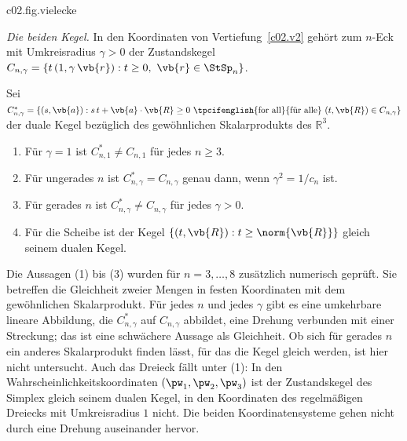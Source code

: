 \begin{vertiefung}
  \begin{tpcfigure}{c02.fig.vielecke}
    \caption{Dasselbe Punktepaar $x_1 = (1,0)$, $x_2 = (-\tfrac34, \tfrac14)$ in drei
      Zustandsräumen, jeweils mit den Niveaulinien eines optimalen Extremaleffekts. (a) Im
      Quadrat $\StSp_4$ liegt $x_2$ auf der Kante, auf der der Effekt den Wert $0$ hat; die
      Unterscheidung gelingt sicher. (b) Im Fünfeck liegt $x_2$ im Inneren, knapp neben
      der Kante mit $f = 0$. (c) In der Scheibe berührt die Linie $f = 0$ den Rand in einem
      einzigen Punkt, und $x_2$ liegt deutlich daneben. Die Optima stehen in
      \eqref{c02.eq.gleiches-paar}.}
  \end{tpcfigure}

  \emph{Die beiden Kegel.} In den Koordinaten von Vertiefung~\ref{c02.v2} gehört zum
  $n$-Eck mit Umkreisradius $\gamma > 0$ der Zustandskegel
  $C_{n,\gamma} = \{ t\,(1, \gamma\,\vb{r}) : t \geq 0,\ \vb{r} \in \StSp_n \}$.

  \begin{proposition}\label{c02.prop.selbstdual}
    Sei $C_{n,\gamma}^{*} = \{ (s, \vb{a}) : s\,t + \vb{a}\cdot\vb{R} \geq 0
    \ \text{\tpcifenglish{for all}{für alle}}\ (t, \vb{R}) \in C_{n,\gamma} \}$ der duale
    Kegel bezüglich des gewöhnlichen Skalarprodukts des $\mathbb{R}^3$.
    \begin{enumerate}
      \item Für $\gamma = 1$ ist $C_{n,1}^{*} \neq C_{n,1}$ für jedes $n \geq 3$.
      \item Für ungerades $n$ ist $C_{n,\gamma}^{*} = C_{n,\gamma}$ genau dann, wenn
        $\gamma^2 = 1/c_n$ ist.
      \item Für gerades $n$ ist $C_{n,\gamma}^{*} \neq C_{n,\gamma}$ für jedes
        $\gamma > 0$.
      \item Für die Scheibe ist der Kegel $\{ (t, \vb{R}) : t \geq \norm{\vb{R}} \}$ gleich
        seinem dualen Kegel.
    \end{enumerate}
  \end{proposition}

  Die Aussagen (1) bis (3) wurden für $n = 3, \dots, 8$ zusätzlich numerisch geprüft. Sie
  betreffen die Gleichheit zweier Mengen in festen Koordinaten mit dem gewöhnlichen
  Skalarprodukt. Für jedes $n$ und jedes $\gamma$ gibt es eine umkehrbare lineare
  Abbildung, die $C_{n,\gamma}^{*}$ auf $C_{n,\gamma}$ abbildet, eine Drehung verbunden
  mit einer Streckung; das ist eine schwächere Aussage als Gleichheit. Ob sich für gerades
  $n$ ein anderes Skalarprodukt finden lässt, für das die Kegel gleich werden, ist hier
  nicht untersucht. Auch das Dreieck fällt unter (1): In den Wahrscheinlichkeitskoordinaten
  $(\pw_1, \pw_2, \pw_3)$ ist der Zustandskegel des Simplex gleich seinem dualen Kegel, in
  den Koordinaten des regelmäßigen Dreiecks mit Umkreisradius $1$ nicht. Die beiden
  Koordinatensysteme gehen nicht durch eine Drehung auseinander hervor.
\end{vertiefung}

